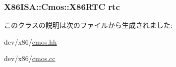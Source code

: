 \label{classX86ISA_1_1Cmos_a4d417c6dbc62e1223649ce26f948735f}
\hypertarget{classX86ISA_1_1Cmos_a9ad248cc4414fc5e93d51266f7461e7d}{
\subsubsection[{rtc}]{\setlength{\rightskip}{0pt plus 5cm} {\bf X86ISA::Cmos::X86RTC}  {\bf rtc}}}
\label{classX86ISA_1_1Cmos_a9ad248cc4414fc5e93d51266f7461e7d}


このクラスの説明は次のファイルから生成されました:\begin{DoxyCompactItemize}
\item 
dev/x86/\hyperlink{cmos_8hh}{cmos.hh}\item 
dev/x86/\hyperlink{cmos_8cc}{cmos.cc}\end{DoxyCompactItemize}
